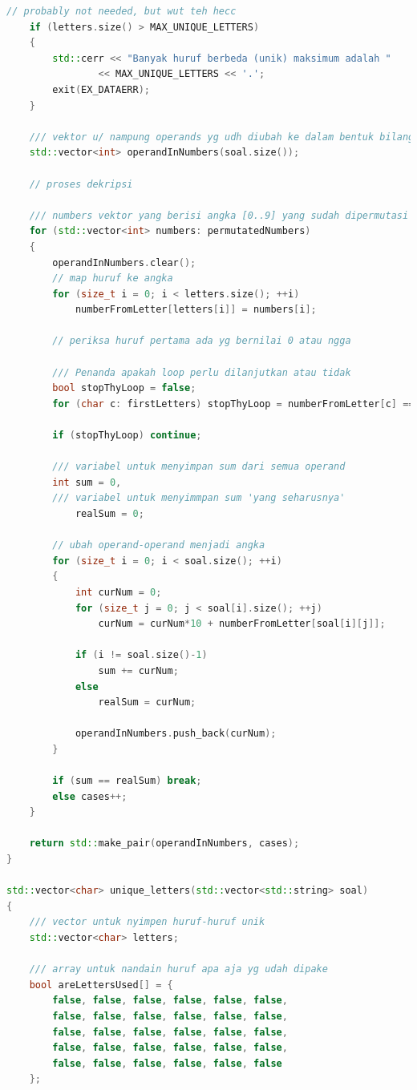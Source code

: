 \documentclass{article}
\begin{document}
\begin{lstlisting}[caption = "main.cpp", language = c++]
    // probably not needed, but wut teh hecc
    if (letters.size() > MAX_UNIQUE_LETTERS)
    {
        std::cerr << "Banyak huruf berbeda (unik) maksimum adalah "
                << MAX_UNIQUE_LETTERS << '.';
        exit(EX_DATAERR);
    }

    /// vektor u/ nampung operands yg udh diubah ke dalam bentuk bilangan
    std::vector<int> operandInNumbers(soal.size());

    // proses dekripsi

    /// numbers vektor yang berisi angka [0..9] yang sudah dipermutasi
    for (std::vector<int> numbers: permutatedNumbers)
    {
        operandInNumbers.clear();
        // map huruf ke angka
        for (size_t i = 0; i < letters.size(); ++i)
            numberFromLetter[letters[i]] = numbers[i];

        // periksa huruf pertama ada yg bernilai 0 atau ngga

        /// Penanda apakah loop perlu dilanjutkan atau tidak
        bool stopThyLoop = false;
        for (char c: firstLetters) stopThyLoop = numberFromLetter[c] == 0;

        if (stopThyLoop) continue;

        /// variabel untuk menyimpan sum dari semua operand
        int sum = 0,
        /// variabel untuk menyimmpan sum 'yang seharusnya'
            realSum = 0;

        // ubah operand-operand menjadi angka
        for (size_t i = 0; i < soal.size(); ++i)
        {
            int curNum = 0;
            for (size_t j = 0; j < soal[i].size(); ++j)
                curNum = curNum*10 + numberFromLetter[soal[i][j]];

            if (i != soal.size()-1)
                sum += curNum;
            else
                realSum = curNum;

            operandInNumbers.push_back(curNum);
        }

        if (sum == realSum) break;
        else cases++;
    }

    return std::make_pair(operandInNumbers, cases);
}

std::vector<char> unique_letters(std::vector<std::string> soal)
{
    /// vector untuk nyimpen huruf-huruf unik
    std::vector<char> letters;

    /// array untuk nandain huruf apa aja yg udah dipake
    bool areLettersUsed[] = {
        false, false, false, false, false, false,
        false, false, false, false, false, false,
        false, false, false, false, false, false,
        false, false, false, false, false, false,
        false, false, false, false, false, false
    };


\end{lstlisting}
\end{document}

